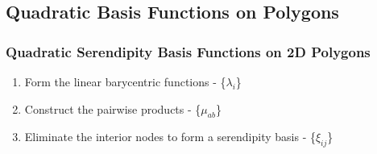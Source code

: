 \documentclass[compress,10pt]{beamer}
\begin{document}
\subsection{Quadratic Basis Functions on Polygons}
\begin{frame}[t]\frametitle{Quadratic Serendipity Basis Functions on 2D Polygons}
\begin{block}{}
\begin{enumerate}
	\item <1-> Form the linear barycentric functions - \{$\lambda_i$\}
	\item <2-> Construct the pairwise products -  \{$\mu_{ab}$\}
	\item <3-> Eliminate the interior nodes to form a serendipity basis - \{$\xi_{ij}$\}
\end{enumerate}
\end{block}
\vspace{1cm}
\begin{columns}[c]
\centering
{}
\centering
{}
\end{columns}
\end{frame}
\end{document}
